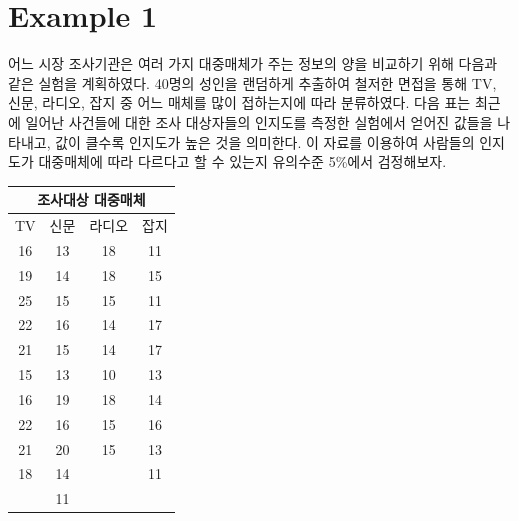 \documentclass{article}
\begin{document}
\pagestyle{fancy}

\section*{Example 1}
어느 시장 조사기관은 여러 가지 대중매체가 주는 정보의 양을 비교하기 위해 다음과 
같은 실험을 계획하였다. 40명의 성인을 랜덤하게 추출하여 철저한 면접을 통해 TV, 신문, 
라디오, 잡지 중 어느 매체를 많이 접하는지에 따라 분류하였다. 다음 표는 최근에 일어난 
사건들에 대한 조사 대상자들의 인지도를 측정한 실험에서 얻어진 값들을 나타내고, 값이 
클수록 인지도가 높은 것을 의미한다. 이 자료를 이용하여 사람들의 인지도가 대중매체에 
따라 다르다고 할 수 있는지 유의수준 5\%에서 검정해보자. 

\begin{table}[htb!]
\centering
\begin{tabularx}{0.5\textwidth}{@{\extracolsep{\fill}}cccc}
 \hline
 \multicolumn{4}{c}{조사대상 대중매체} \\ \hline
TV & 신문 & 라디오 & 잡지 \\ \hline
16 & 13 & 18 & 11 \\
19 & 14 & 18 & 15 \\
25 & 15 & 15 & 11 \\
22 & 16 & 14 & 17 \\
21 & 15 & 14 & 17 \\
15 & 13 & 10 & 13 \\
16 & 19 & 18 & 14 \\
22 & 16 & 15 & 16 \\
21 & 20 & 15 & 13 \\
18 & 14 & & 11 \\
& 11 & & \\
\hline
\end{tabularx}
\end{table}
\end{document}
